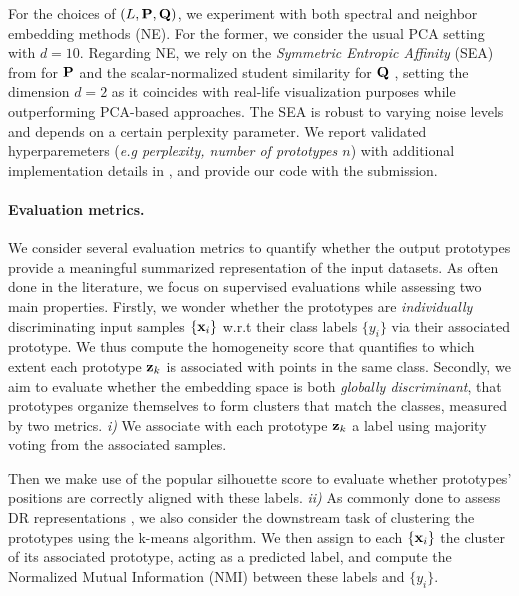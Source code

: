 For the choices of $(L, {\mathbf{P}}, {\mathbf{Q}})$, we experiment with both spectral and neighbor embedding methods (NE). For the former, we consider the usual PCA setting with $d = 10$. Regarding NE, we rely on the \emph{Symmetric Entropic Affinity} (SEA) from \citep{van2023snekhorn} for ${\mathbf{P}}$ and the scalar-normalized student similarity for ${\mathbf{Q}}$ \citep{van2008visualizing}, setting the dimension $d=2$ as it coincides with real-life visualization purposes while outperforming PCA-based approaches. The SEA is robust to varying noise levels and depends on a certain perplexity parameter. We report validated hyperparemeters (\emph{e.g perplexity, number of prototypes $n$}) with additional implementation details in , and provide our code with the submission. 

\paragraph{Evaluation metrics.}
We consider several evaluation metrics to quantify whether the output prototypes provide a meaningful summarized representation of the input datasets. As often done in the literature, we focus on supervised evaluations while assessing two main properties.
Firstly, we wonder whether the prototypes are \emph{individually} discriminating
input samples $\{{\mathbf{x}}_i\}$ w.r.t their class labels $\{y_i\}$ via their
associated prototype. We thus
compute the homogeneity score \citep{rosenberg2007v} that quantifies to which
extent each prototype ${\mathbf{z}}_k$ is associated with points in the same class. 
Secondly, we aim to evaluate whether the embedding space is both \emph{globally discriminant}, \ie that prototypes organize themselves to form clusters that match the classes, measured by two metrics. \emph{i)} 
We associate with each prototype ${\mathbf{z}}_k$ a label using majority voting from the associated samples.

Then we make use of the
popular silhouette score \citep{rousseeuw1987silhouettes} to evaluate whether
prototypes' positions are correctly aligned with these labels. \emph{ii)} As
commonly done to assess DR representations \citep{huang2022towards}, we also consider
the downstream task of clustering the prototypes using the k-means algorithm.
We then assign to each $\{{\mathbf{x}}_i\}$ %
the cluster of its associated prototype, acting as a predicted label, and compute the Normalized Mutual Information (NMI) \citep{kvaalseth2017normalized} between these labels and $\{y_i\}$.  %

